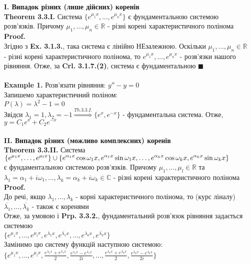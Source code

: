 \documentclass[a4paper, 14pt]{extarticle}
\def\huge{\displaystyle}
\def\th#1{\textbf{Theorem {#1}}}
\def\proof{\textbf{Proof.}\\}
\def\bigline{\vspace{5mm}\\}
\def\qed{$\blacksquare$}
\begin{document}
\\
\\
\textbf{I. Випадок різних (лише дійсних) коренів}\\
\th{3.3.I.} Система $\huge \{e^{\mu_1 x}, \dots, e^{\mu_n x}\}$ є фундаментальною системою розв'язків. Причому $\mu_1, \dots, \mu_n \in \mathbb{R}$ - різні корені характеристичного полінома\\
\proof
Згідно з \textbf{Ex. 3.1.3.}, така система є лінійно НЕзалежною. Оскільки $\mu_1, \dots, \mu_n \in \mathbb{R}$ - різні корені характеристичного полінома, то $e^{\mu_1 x}, \dots, e^{\mu_n x}$ - розв'язки нашого рівняння. Отже, за \textbf{Crl. 3.1.7.(2)}, система є фундаментальною \qed
\\
\bigline
\textbf{Example 1.} Розв'язати рівняння: $y'' - y = 0$\\
Запишемо характеристичний поліном:\\
$P(\lambda) = \lambda^2 - 1 = 0$\\
Звідси $\lambda_1 = 1, \lambda_2 = -1 \overset{Th. 3.3.I.}{\Rightarrow} \{e^x, e^{-x}\}$ - фундаментальна система.
Отже, $y = C_1e^x + C_2e^{-x}$
\\
\bigline
\textbf{II. Випадок різних (можливо комплексних) коренів}\\
\th{3.3.II.} Система $\\ \huge \{e^{\mu_1 x}, \dots, e^{\mu_l x}\} \cup \{e^{\alpha_1 x} \cos \omega_1 x, e^{\alpha_1 x} \sin \omega_1 x, \dots, e^{\alpha_k x} \cos \omega_k x, e^{\alpha_k x} \sin \omega_k x\}$ \\ є фундаментальною системою розв'язків. Причому $\mu_1, \dots, \mu_l \in \mathbb{R}$ та $\lambda_1 = \alpha_1 + i\omega_1, \dots, \lambda_k = \alpha_k + i\omega_k \in \mathbb{C}$ - різні корені характеристичного полінома\\
\proof
До речі, якщо $\lambda_1, \dots, \lambda_k$ - корні характеристичного полінома, то (курс ліналу) $\overline{\lambda_1}, \dots, \overline{\lambda_k}$ - також є коренями\\
Отже, за умовою і \textbf{Prp. 3.3.2.}, фундаментальний розв'язок рівняння задається системою\\
$\{e^{\mu_1 x}, \dots, e^{\mu_l x}, e^{\lambda_1 x}, e^{\overline{\lambda_1} x}, \dots, e^{\lambda_k x}, e^{\overline{\lambda_k} x}\}$\\
Замінимо цю систему функцій наступною системою:\\
$\huge \{e^{\mu_1 x}, \dots, e^{\mu_l x}, \frac{e^{\lambda_1 x} + e^{\overline{\lambda_1} x}}{2}, \frac{e^{\lambda_1 x} - e^{\overline{\lambda_1} x}}{2i}, \dots, \frac{e^{\lambda_k x} + e^{\overline{\lambda_k} x}}{2}, \frac{e^{\lambda_k x} - e^{\overline{\lambda_k} x}}{2i}\}$\\
\end{document}
